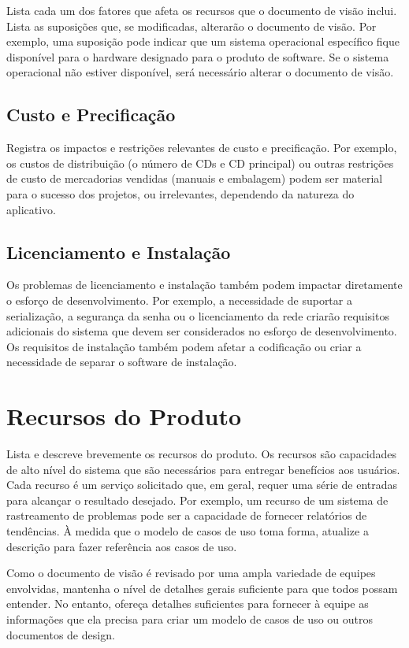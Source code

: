 \documentclass{report}
\begin{document}
Lista cada um dos fatores que afeta os recursos que o documento de visão
inclui. Lista as suposições que, se modificadas, alterarão o documento de
visão. Por exemplo, uma suposição pode indicar que um sistema operacional
específico fique disponível para o hardware designado para o produto de
software. Se o sistema operacional não estiver disponível, será necessário
alterar o documento de visão.

\section{Custo e Precificação}

Registra os impactos e restrições relevantes de custo e precificação. Por
exemplo, os custos de distribuição (o número de CDs e CD principal) ou outras
restrições de custo de mercadorias vendidas (manuais e embalagem) podem ser
material para o sucesso dos projetos, ou irrelevantes, dependendo da natureza
do aplicativo.

\section{Licenciamento e Instalação}

Os problemas de licenciamento e instalação também podem impactar diretamente o
esforço de desenvolvimento. Por exemplo, a necessidade de suportar a
serialização, a segurança da senha ou o licenciamento da rede criarão
requisitos adicionais do sistema que devem ser considerados no esforço de
desenvolvimento. Os requisitos de instalação também podem afetar a codificação
ou criar a necessidade de separar o software de instalação.

\chapter{Recursos do Produto}

Lista e descreve brevemente os recursos do produto. Os recursos são capacidades
de alto nível do sistema que são necessários para entregar benefícios aos
usuários. Cada recurso é um serviço solicitado que, em geral, requer uma série
de entradas para alcançar o resultado desejado. Por exemplo, um recurso de um
sistema de rastreamento de problemas pode ser a capacidade de fornecer
relatórios de tendências. À medida que o modelo de casos de uso toma forma,
atualize a descrição para fazer referência aos casos de uso.

Como o documento de visão é revisado por uma ampla variedade de equipes
envolvidas, mantenha o nível de detalhes gerais suficiente para que todos
possam entender. No entanto, ofereça detalhes suficientes para fornecer à
equipe as informações que ela precisa para criar um modelo de casos de uso ou
outros documentos de design.
\end{document}
